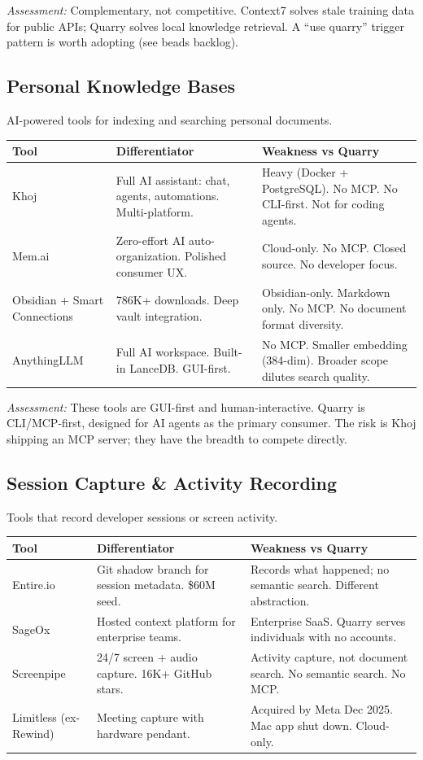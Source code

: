 \documentclass[11pt,letterpaper]{article}
\begin{document}
\vspace{0.5em}
\textit{Assessment:} Complementary, not competitive. Context7 solves stale
training data for public APIs; Quarry solves local knowledge retrieval.
A ``use quarry'' trigger pattern is worth adopting (see beads backlog).

\subsection*{Personal Knowledge Bases}

AI-powered tools for indexing and searching personal documents.

\begin{tabularx}{\textwidth}{@{} l X X @{}}
\toprule
\textbf{Tool} & \textbf{Differentiator} & \textbf{Weakness vs Quarry} \\
\midrule
Khoj & Full AI assistant: chat, agents, automations. Multi-platform. & Heavy (Docker + PostgreSQL). No MCP. No CLI-first. Not for coding agents. \\
Mem.ai & Zero-effort AI auto-organization. Polished consumer UX. & Cloud-only. No MCP. Closed source. No developer focus. \\
Obsidian + Smart Connections & 786K+ downloads. Deep vault integration. & Obsidian-only. Markdown only. No MCP. No document format diversity. \\
AnythingLLM & Full AI workspace. Built-in LanceDB. GUI-first. & No MCP. Smaller embedding (384-dim). Broader scope dilutes search quality. \\
\bottomrule
\end{tabularx}

\vspace{0.5em}
\textit{Assessment:} These tools are GUI-first and human-interactive. Quarry is
CLI/MCP-first, designed for AI agents as the primary consumer. The risk is Khoj
shipping an MCP server; they have the breadth to compete directly.

\subsection*{Session Capture \& Activity Recording}

Tools that record developer sessions or screen activity.

\begin{tabularx}{\textwidth}{@{} l X X @{}}
\toprule
\textbf{Tool} & \textbf{Differentiator} & \textbf{Weakness vs Quarry} \\
\midrule
Entire.io & Git shadow branch for session metadata. \$60M seed. & Records what happened; no semantic search. Different abstraction. \\
SageOx & Hosted context platform for enterprise teams. & Enterprise SaaS. Quarry serves individuals with no accounts. \\
Screenpipe & 24/7 screen + audio capture. 16K+ GitHub stars. & Activity capture, not document search. No semantic search. No MCP. \\
Limitless (ex-Rewind) & Meeting capture with hardware pendant. & Acquired by Meta Dec 2025. Mac app shut down. Cloud-only. \\
\bottomrule
\end{tabularx}
\end{document}
